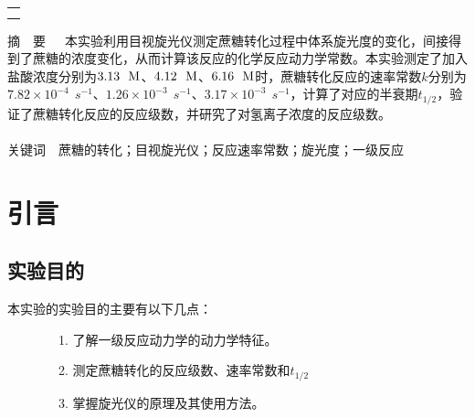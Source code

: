\documentclass[12pt]{article}
\begin{document}
\begin{titlepage}
\begin{center}
            \begin{tabular*}{\textwidth}{c}
                \\ %
                \\ %
                \\ %
                \hline %
            \end{tabular*}
        \end{center}
        \textsf{\textcolor{BrickRed}{摘\ \ 要}}\ \  \  本实验利用目视旋光仪测定蔗糖转化过程中体系旋光度的变化，间接得到了蔗糖的浓度变化，从而计算该反应的化学反应动力学常数。本实验测定了加入盐酸浓度分别为$3.13\ \ {\rm M}$、$4.12\ \ {\rm M}$、$6.16\ \ {\rm M}$时，蔗糖转化反应的速率常数$k$分别为$7.82\times10^{-4}\ \ s^{-1}$、$1.26\times10^{-3}\ \ s^{-1}$、$3.17\times10^{-3}\ \ s^{-1}$，计算了对应的半衰期$t_{1/2}$，验证了蔗糖转化反应的反应级数，并研究了对氢离子浓度的反应级数。
        \\
        \\
        \textsf{\textcolor{BrickRed}{关键词}}\ \ 蔗糖的转化；目视旋光仪；反应速率常数；旋光度；一级反应
    \end{titlepage}

    \section{引言}
		\subsection{实验目的}
			本实验的实验目的主要有以下几点\citealp{physchemlab}：\par
			\ \ \ \ \ \ \ \ 1. 了解一级反应动力学的动力学特征。\par
			\ \ \ \ \ \ \ \	2. 测定蔗糖转化的反应级数、速率常数和$t_{1/2}$\par
			\ \ \ \ \ \ \ \	3. 掌握旋光仪的原理及其使用方法。\par

		\par
\end{document}
